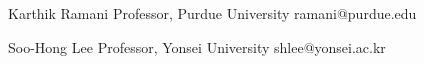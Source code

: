 


\begin{cvskills}


\cvskill
{Karthik Ramani} %
{Professor, Purdue University \hspace{21.5em} ramani@purdue.edu}

\cvskill
{Soo-Hong Lee} %
{Professor, Yonsei University \hspace{22em} shlee@yonsei.ac.kr}


\end{cvskills}
